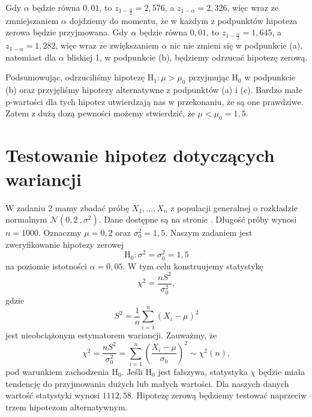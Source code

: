 \documentclass[12pt]{mwart}
\begin{document}
	\noindent Gdy $\alpha$ będzie równa $0,01$, to $z_{1-\frac{\alpha}{2}}=2,576$, a  $z_{1-\alpha}=2,326$, więc wraz ze zmniejszaniem $\alpha$ dojdziemy do momentu, że w każdym z podpunktów hipoteza zerowa będzie przyjmowana. 
	Gdy $\alpha$ będzie równa $0,01$, to $z_{1-\frac{\alpha}{2}}=1,645$, a  $z_{1-\alpha}=1,282$, więc wraz ze zwiększaniem $\alpha$ nic nie zmieni się w podpunkcie (a), natomiast dla $\alpha$ bliskiej 1, w podpunkcie (b), będziemy odrzucać hipotezę zerową.\vspace{2mm}
	
	\noindent Podsumowując, odrzuciliśmy hipotezę $\mathrm{H_1}:\mu > \mu_0$ przyjmując $\mathrm{H_0}$ w podpunkcie (b) oraz przyjęliśmy hipotezy alternatywne z podpunktów (a) i (c). Bardzo małe p-wartości dla tych hipotez utwierdzają nas w przekonaniu, że są one prawdziwe. Zatem z dużą dozą pewności możemy stwierdzić, że $\mu < \mu_0 = 1,5$.
	
	
	
	\section{Testowanie hipotez dotyczących wariancji}
	
	\noindent W zadaniu 2 mamy zbadać próbę $X_1, \dots, X_n$ z populacji generalnej o rozkładzie normalnym $\mathcal{N}(0,2\ , \sigma^2)$. Dane dostępne są na stronie \cite{dane2}. Długość próby wynosi $n = 1000$. Oznaczmy $\mu = 0,2$ oraz $\sigma_0^2 = 1,5$. Naszym zadaniem jest zweryfikowanie hipotezy zerowej
	$$ \mathrm{H_0}: \sigma^2 = \sigma_0^2 = 1,5 $$
	na poziomie istotności $\alpha = 0,05$. W tym celu konstruujemy statystykę
	$$ \chi^2 = \frac{nS^2}{\sigma_0^2}, $$
	gdzie
	$$ S^2 = \frac{1}{n} \sum_{i=1}^n (X_i - \mu)^2 $$
	jest nieobciążonym estymatorem wariancji. Zauważmy, że
	$$ \chi^2 = \frac{nS^2}{\sigma_0^2} = \sum_{i=1}^n \left(\frac{X_i - \mu}{\sigma_0}\right)^2 \sim \chi^2(n), $$
	pod warunkiem zachodzenia $\mathrm{H_0}$. Jeśli $\mathrm{H_0}$ jest fałszywa, statystyka $\chi$ będzie miała tendencję do przyjmowania dużych lub małych wartości. Dla naszych danych wartość statystyki wynosi {\boldmath$1112,58$}. Hipotezę zerową będziemy testować naprzeciw trzem hipotezom alternatywnym.
	
\end{document}
